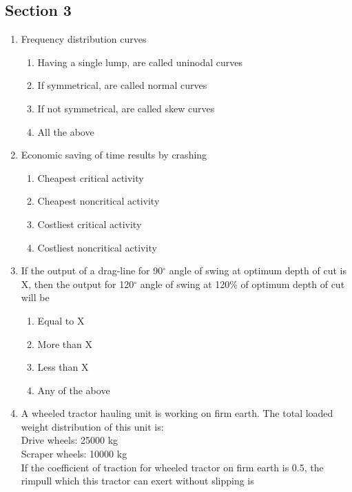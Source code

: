 \documentclass[11pt,a4paper]{article}
\begin{document}
\subsection*{Section 3}
\begin{enumerate}
\item{Frequency distribution curves}
\begin{enumerate}[label=\Alph*.]
\item{Having a single lump, are called uninodal curves}
\item{If symmetrical, are called normal curves}
\item{If not symmetrical, are called skew curves}
\item{All the above}
\end{enumerate}
\item{Economic saving of time results by crashing}
\begin{enumerate}[label=\Alph*.]
\item{Cheapest critical activity}
\item{Cheapest noncritical activity}
\item{Costliest critical activity}
\item{Costliest noncritical activity}
\end{enumerate}
\item{If the output of a drag-line for 90$^\circ$ angle of swing at optimum depth of cut is X, then the output for 120$^\circ$ angle of swing at 120\% of optimum depth of cut will be
}
\begin{enumerate}[label=\Alph*.]
\item{Equal to X}
\item{More than X}
\item{Less than X}
\item{Any of the above}
\end{enumerate}
\item{A wheeled tractor hauling unit is working on firm earth. The total loaded weight distribution of this unit is: \\
 Drive wheels: 25000 kg \\
 Scraper wheels: 10000 kg \\
If the coefficient of traction for wheeled tractor on firm earth is 0.5, the rimpull which this tractor can exert without slipping is}
\\
\end{enumerate}
\end{document}
